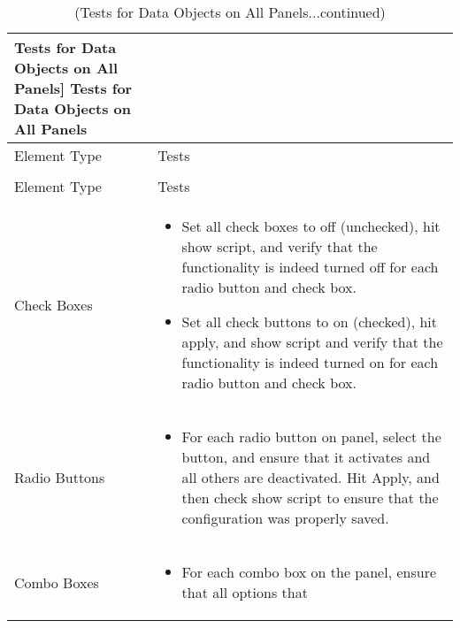  \begin{longtable}{p{1.25 in} |p{4.5 in} }
 \caption
 [Tests for Data Objects on All Panels]
 {Tests for Data Objects on All Panels \label{Table:DataElementTests}}\\
 \hline\hline
 Element Type & Tests\\
 \hline
 \endfirsthead
 \caption[]{(Tests for Data Objects on All Panels...continued)}\\
 \hline\hline
 Element Type & Tests\\
 \hline\hline
 \endhead
 \hline
 \hline
 \endfoot
 \hline
 \hline
 \endlastfoot
Check Boxes &
\begin{itemize} \vspace{-.25 in}
\item Set all check boxes to off (unchecked), hit show script, and verify that the functionality is
indeed turned off for each radio button and check box.
%
\item Set all check buttons to on (checked), hit apply, and show script
and verify that the functionality is indeed turned on for each radio
button and check box.
\end{itemize} \\
\hline
Radio Buttons &
\begin{itemize} \vspace{-.25 in}
   \item For each radio button on panel, select the button, and ensure that it activates
   and all others are deactivated.  Hit Apply, and then check show
   script to ensure that the configuration was properly saved.
\end{itemize} \\
\hline
Combo Boxes &
\begin{itemize} \vspace{-.25 in}
\item  For each combo box on the panel, ensure that all options that

\end{itemize}
\end{longtable}
